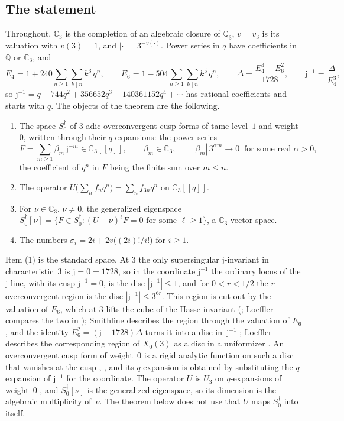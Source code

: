 \documentclass[11pt]{amsart}
\theoremstyle{definition}
\numberwithin{equation}{section}
\newcommand{\Q}{\mathbb{Q}}
\newcommand{\Cp}{\mathbb{C}_3}
\newcommand{\Qp}{\mathbb{Q}_3}
\newcommand{\Sd}{S_0^{\dagger}}
\newcommand{\jj}{\mathrm{j}}
\newcommand{\jinv}{\jj^{-1}}
\newcommand{\sig}{\sigma}
\begin{document}
\subsection*{The statement}
Throughout, $\Cp$ is the completion of an algebraic closure of $\Qp$, $v=v_3$ is its valuation with $v(3)=1$, and $|\cdot|=3^{-v(\cdot)}$. Power series in $q$ have coefficients in $\Q$ or $\Cp$, and
\[
E_4=1+240\sum_{n\ge1}\sum_{k\mid n}k^3\,q^n,\qquad E_6=1-504\sum_{n\ge1}\sum_{k\mid n}k^5\,q^n,\qquad \Delta=\frac{E_4^3-E_6^2}{1728},\qquad \jinv=\frac{\Delta}{E_4^3},
\]
so $\jinv=q-744q^2+356652q^3-140361152q^4+\cdots$ has rational coefficients and starts with $q$. The objects of the theorem are the following.
\begin{enumerate}
\item The space $\Sd$ of $3$-adic overconvergent cusp forms of tame level~$1$ and weight~$0$, written through their $q$-expansions: the power series
\begin{equation}\label{eq:Sd}
F=\sum_{m\ge1}\beta_m\,\jj^{-m}\in\Cp[[q]],\qquad \beta_m\in\Cp,\qquad |\beta_m|\,3^{\alpha m}\to0\ \text{ for some real } \alpha>0,
\end{equation}
the coefficient of $q^n$ in $F$ being the finite sum over $m\le n$.
\item The operator $U\bigl(\sum_n f_nq^n\bigr)=\sum_n f_{3n}q^n$ on $\Cp[[q]]$.
\item For $\nu\in\Cp$, $\nu\ne0$, the generalized eigenspace $\Sd[\nu]=\{F\in\Sd:(U-\nu)^\ell F=0 \text{ for some } \ell\ge1\}$, a $\Cp$-vector space.
\item The numbers $\sig_i=2i+2v\bigl((2i)!/i!\bigr)$ for $i\ge1$.
\end{enumerate}
Item (1) is the standard space. At $3$ the only supersingular $\jj$-invariant in characteristic~$3$ is $\jj=0=1728$, so in the coordinate $\jinv$ the ordinary locus of the $\jj$-line, with its cusp $\jinv=0$, is the disc $|\jinv|\le1$, and for $0<r<1/2$ the $r$-overconvergent region is the disc $|\jinv|\le3^{6r}$. This region is cut out by the valuation of $E_6$, which at $3$ lifts the cube of the Hasse invariant (\cite[\S1]{Vonk15}; Loeffler compares the two in \cite[Appendix~A]{Loe07}); Smithline describes the region through the valuation of $E_6$, and the identity $E_6^2=(\jj-1728)\Delta$ turns it into a disc in~$\jinv$ \cite[Lemma~3.4 and the proof of Proposition~3.5]{Smi07}; Loeffler describes the corresponding region of $X_0(3)$ as a disc in a uniformizer \cite[\S2]{Loe07}. An overconvergent cusp form of weight~$0$ is a rigid analytic function on such a disc that vanishes at the cusp \cite[2.2]{Katz73}, \cite[\S B2]{Col97}, and its $q$-expansion is obtained by substituting the $q$-expansion of $\jinv$ for the coordinate. The operator $U$ is $U_3$ on $q$-expansions of weight~$0$ \cite[Introduction]{Col97}, and $\Sd[\nu]$ is the generalized eigenspace, so its dimension is the algebraic multiplicity of~$\nu$. The theorem below does not use that $U$ maps $\Sd$ into itself.
\end{document}
